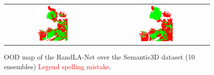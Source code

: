 \begin{figure}[h!]
\begin{tabular}{cc}
            \includegraphics[width=0.33\textwidth, height=0.18\textheight]{images/ood_imgs/sem3d_of/ent/fout_sem3d_OOD_3.pdf}&
            \includegraphics[width=0.33\textwidth, height=0.18\textheight]{images/ood_imgs/sem3d_of/ent/fout_sem3d_of_OOD_3.pdf}\\
        \end{tabular}
        \caption{OOD map of the RandLA-Net over the Semantic3D dataset (10 ensembles) \textcolor{red}{Legend spelling mistake}.}
        \label{fig:fout_oodmap_sem3d_OF_ent}
    \end{figure} 
    \FloatBarrier

